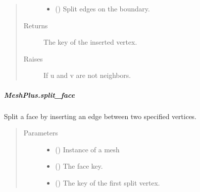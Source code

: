 \documentclass[letterpaper,10pt,english]{sphinxmanual}
\begin{document}
\begin{fulllineitems}
\begin{fulllineitems}
\begin{quote}
\begin{description}
\begin{itemize}
\item {} 
 () \textendash{} Split edges on the boundary.

\end{itemize}

\item[{Returns}] \leavevmode
{} \textendash{} The key of the inserted vertex.

\item[{Raises}] \leavevmode
{} \textendash{} If u and v are not neighbors.

\end{description}\end{quote}

\end{fulllineitems}



\subparagraph{MeshPlus.split\_face}
\label{\detokenize{api/generated/directional_clustering.mesh.MeshPlus.split_face:meshplus-split-face}}\label{\detokenize{api/generated/directional_clustering.mesh.MeshPlus.split_face::doc}}

\begin{fulllineitems}
\label{\detokenize{api/generated/directional_clustering.mesh.MeshPlus.split_face:directional_clustering.mesh.MeshPlus.split_face}}
Split a face by inserting an edge between two specified vertices.
\begin{quote}\begin{description}
\item[{Parameters}] \leavevmode\begin{itemize}
\item {} 
 () \textendash{} Instance of a mesh

\item {} 
 () \textendash{} The face key.

\item {} 
 () \textendash{} The key of the first split vertex.


\end{itemize}
\end{description}
\end{quote}
\end{fulllineitems}
\end{fulllineitems}
\end{document}
